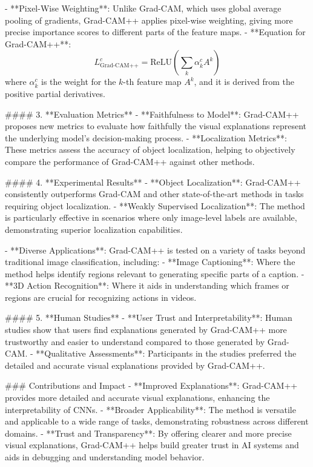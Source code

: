 - **Pixel-Wise Weighting**: Unlike Grad-CAM, which uses global average pooling of gradients, Grad-CAM++ applies pixel-wise weighting, giving more precise importance scores to different parts of the feature maps.
  - **Equation for Grad-CAM++**: 
    \[
    L_{\text{Grad-CAM++}}^c = \text{ReLU} \left( \sum_k \alpha_k^c A^k \right)
    \]
    where \(\alpha_k^c\) is the weight for the \(k\)-th feature map \(A^k\), and it is derived from the positive partial derivatives.

#### 3. **Evaluation Metrics**
- **Faithfulness to Model**: Grad-CAM++ proposes new metrics to evaluate how faithfully the visual explanations represent the underlying model's decision-making process.
  - **Localization Metrics**: These metrics assess the accuracy of object localization, helping to objectively compare the performance of Grad-CAM++ against other methods.

#### 4. **Experimental Results**
- **Object Localization**: Grad-CAM++ consistently outperforms Grad-CAM and other state-of-the-art methods in tasks requiring object localization.
  - **Weakly Supervised Localization**: The method is particularly effective in scenarios where only image-level labels are available, demonstrating superior localization capabilities.

- **Diverse Applications**: Grad-CAM++ is tested on a variety of tasks beyond traditional image classification, including:
  - **Image Captioning**: Where the method helps identify regions relevant to generating specific parts of a caption.
  - **3D Action Recognition**: Where it aids in understanding which frames or regions are crucial for recognizing actions in videos.

#### 5. **Human Studies**
- **User Trust and Interpretability**: Human studies show that users find explanations generated by Grad-CAM++ more trustworthy and easier to understand compared to those generated by Grad-CAM.
  - **Qualitative Assessments**: Participants in the studies preferred the detailed and accurate visual explanations provided by Grad-CAM++.

### Contributions and Impact
- **Improved Explanations**: Grad-CAM++ provides more detailed and accurate visual explanations, enhancing the interpretability of CNNs.
- **Broader Applicability**: The method is versatile and applicable to a wide range of tasks, demonstrating robustness across different domains.
- **Trust and Transparency**: By offering clearer and more precise visual explanations, Grad-CAM++ helps build greater trust in AI systems and aids in debugging and understanding model behavior.

